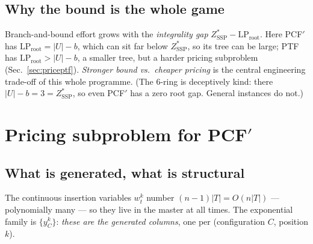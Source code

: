 \documentclass[11pt,a4paper]{article}
\theoremstyle{plain}
\theoremstyle{definition}
\newcommand{\ZSSP}{Z_{\mathrm{SSP}}^{*}}
\begin{document}
\subsection{Why the bound is the whole game}
Branch-and-bound effort grows with the \emph{integrality gap} $\ZSSP-\mathrm{LP}_{\text{root}}$.
Here PCF$'$ has $\mathrm{LP}_{\text{root}}=|U|-b$, which can sit far below $\ZSSP$, so its tree
can be large; PTF has $\mathrm{LP}_{\text{root}}>|U|-b$, a smaller tree, but a harder pricing
subproblem (Sec.~\ref{sec:priceptf}). \emph{Stronger bound vs.\ cheaper pricing} is the central
engineering trade-off of this whole programme. (The $6$-ring is deceptively kind: there
$|U|-b=3=\ZSSP$, so even PCF$'$ has a zero root gap. General instances do not.)

\section{Pricing subproblem for PCF$'$}\label{sec:pricepcf}
\subsection{What is generated, what is structural}
The continuous insertion variables $w_t^k$ number $(n-1)|T|=O(n|T|)$ --- polynomially many ---
so they live in the master at all times. The exponential family is $\{y_C^k\}$: \emph{these are
the generated columns}, one per (configuration $C$, position $k$).
\end{document}
